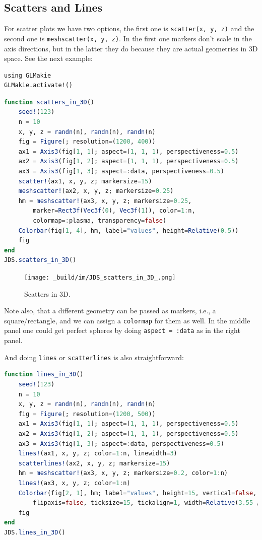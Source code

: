 \documentclass[
  notoc %
]{tufte-book}
\newcommand{\passthrough}[1]{#1}
\begin{document}
\hypertarget{scatters-and-lines}{%
\subsection{Scatters and Lines}\label{scatters-and-lines}}

For scatter plots we have two options, the first one is
\passthrough{\lstinline!scatter(x, y, z)!} and the second one is
\passthrough{\lstinline!meshscatter(x, y, z)!}. In the first one markers
don't scale in the axis directions, but in the latter they do because
they are actual geometries in 3D space. See the next example:

\begin{lstlisting}
using GLMakie
GLMakie.activate!()
\end{lstlisting}

\begin{lstlisting}[language=Julia]
function scatters_in_3D()
    seed!(123)
    n = 10
    x, y, z = randn(n), randn(n), randn(n)
    fig = Figure(; resolution=(1200, 400))
    ax1 = Axis3(fig[1, 1]; aspect=(1, 1, 1), perspectiveness=0.5)
    ax2 = Axis3(fig[1, 2]; aspect=(1, 1, 1), perspectiveness=0.5)
    ax3 = Axis3(fig[1, 3]; aspect=:data, perspectiveness=0.5)
    scatter!(ax1, x, y, z; markersize=15)
    meshscatter!(ax2, x, y, z; markersize=0.25)
    hm = meshscatter!(ax3, x, y, z; markersize=0.25,
        marker=Rect3f(Vec3f(0), Vec3f(1)), color=1:n,
        colormap=:plasma, transparency=false)
    Colorbar(fig[1, 4], hm, label="values", height=Relative(0.5))
    fig
end
JDS.scatters_in_3D()
\end{lstlisting}

\begin{figure}
\hypertarget{fig:scatters_in_3D}{%
\centering
\texttt{[image: \_build/im/JDS\_scatters\_in\_3D\_.png]}
\caption{Scatters in 3D.}\label{fig:scatters_in_3D}
}
\end{figure}

Note also, that a different geometry can be passed as markers, i.e., a
square/rectangle, and we can assign a \passthrough{\lstinline!colormap!}
for them as well. In the middle panel one could get perfect spheres by
doing \passthrough{\lstinline!aspect = :data!} as in the right panel.

And doing \passthrough{\lstinline!lines!} or
\passthrough{\lstinline!scatterlines!} is also straightforward:

\begin{lstlisting}[language=Julia]
function lines_in_3D()
    seed!(123)
    n = 10
    x, y, z = randn(n), randn(n), randn(n)
    fig = Figure(; resolution=(1200, 500))
    ax1 = Axis3(fig[1, 1]; aspect=(1, 1, 1), perspectiveness=0.5)
    ax2 = Axis3(fig[1, 2]; aspect=(1, 1, 1), perspectiveness=0.5)
    ax3 = Axis3(fig[1, 3]; aspect=:data, perspectiveness=0.5)
    lines!(ax1, x, y, z; color=1:n, linewidth=3)
    scatterlines!(ax2, x, y, z; markersize=15)
    hm = meshscatter!(ax3, x, y, z; markersize=0.2, color=1:n)
    lines!(ax3, x, y, z; color=1:n)
    Colorbar(fig[2, 1], hm; label="values", height=15, vertical=false,
        flipaxis=false, ticksize=15, tickalign=1, width=Relative(3.55 / 4))
    fig
end
JDS.lines_in_3D()
\end{lstlisting}
\end{document}
